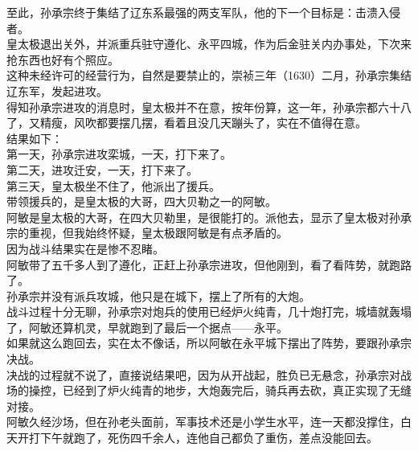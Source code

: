 \begin{multicols}{\theparacolNo}
至此，孙承宗终于集结了辽东系最强的两支军队，他的下一个目标是：击溃入侵者。\\

皇太极退出关外，并派重兵驻守遵化、永平四城，作为后金驻关内办事处，下次来抢东西也好有个照应。\\

这种未经许可的经营行为，自然是要禁止的，崇祯三年（1630）二月，孙承宗集结辽东军，发起进攻。\\

得知孙承宗进攻的消息时，皇太极并不在意，按年份算，这一年，孙承宗都六十八了，又精瘦，风吹都要摆几摆，看着且没几天蹦头了，实在不值得在意。\\

结果如下：\\

第一天，孙承宗进攻栾城，一天，打下来了。\\

第二天，进攻迁安，一天，打下来了。\\

第三天，皇太极坐不住了，他派出了援兵。\\

带领援兵的，是皇太极的大哥，四大贝勒之一的阿敏。\\

阿敏是皇太极的大哥，在四大贝勒里，是很能打的。派他去，显示了皇太极对孙承宗的重视，但我始终怀疑，皇太极跟阿敏是有点矛盾的。\\

因为战斗结果实在是惨不忍睹。\\

阿敏带了五千多人到了遵化，正赶上孙承宗进攻，但他刚到，看了看阵势，就跑路了。\\

孙承宗并没有派兵攻城，他只是在城下，摆上了所有的大炮。\\

战斗过程十分无聊，孙承宗对炮兵的使用已经炉火纯青，几十炮打完，城墙就轰塌了，阿敏还算机灵，早就跑到了最后一个据点——永平。\\

如果就这么跑回去，实在太不像话，所以阿敏在永平城下摆出了阵势，要跟孙承宗决战。\\

决战的过程就不说了，直接说结果吧，因为从开战起，胜负已无悬念，孙承宗对战场的操控，已经到了炉火纯青的地步，大炮轰完后，骑兵再去砍，真正实现了无缝对接。\\

阿敏久经沙场，但在孙老头面前，军事技术还是小学生水平，连一天都没撑住，白天开打下午就跑了，死伤四千余人，连他自己都负了重伤，差点没能回去。\\


\end{multicols}
